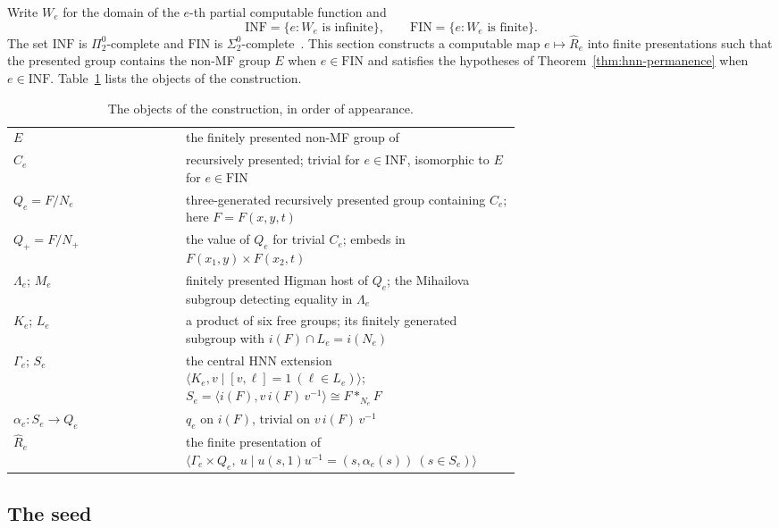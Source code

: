 \documentclass[11pt]{amsart}
\theoremstyle{remark}
\theoremstyle{plain}
\begin{document}
Write $W_e$ for the domain of the $e$-th partial computable function and
\[
 \mathrm{INF}=\{e:W_e\text{ is infinite}\},
 \qquad
 \mathrm{FIN}=\{e:W_e\text{ is finite}\}.
\]
The set $\mathrm{INF}$ is $\Pi^0_2$-complete and $\mathrm{FIN}$ is
$\Sigma^0_2$-complete~\cite[Chapter~IV]{Soare}.  This section constructs a
computable map $e\mapsto\widehat R_e$ into finite presentations such that
the presented group contains the non-MF group $E$ when $e\in\mathrm{FIN}$
and satisfies the hypotheses of Theorem~\ref{thm:hnn-permanence} when
$e\in\mathrm{INF}$.  Table~\ref{tab:objects} lists the objects of the
construction.

\begin{table}[htb]
\centering\small
\begin{tabular}{@{}l@{\qquad}p{0.66\linewidth}@{}}
$E$ & the finitely presented non-MF group of~\cite[Theorem~C]{NonMF} \\[1pt]
$C_e$ & recursively presented; trivial for $e\in\mathrm{INF}$, isomorphic
  to $E$ for $e\in\mathrm{FIN}$ \\[1pt]
$Q_e=F/N_e$ & three-generated recursively presented group containing
  $C_e$; here $F=F(x,y,t)$ \\[1pt]
$Q_+=F/N_+$ & the value of $Q_e$ for trivial $C_e$; embeds in
  $F(x_1,y)\times F(x_2,t)$ \\[1pt]
$\Lambda_e$; $M_e$ & finitely presented Higman host of $Q_e$; the
  Mihailova subgroup detecting equality in $\Lambda_e$ \\[1pt]
$K_e$; $L_e$ & a product of six free groups; its finitely generated
  subgroup with $i(F)\cap L_e=i(N_e)$ \\[1pt]
$\Gamma_e$; $S_e$ & the central HNN extension
  $\langle K_e,v\mid[v,\ell]=1\ (\ell\in L_e)\rangle$;
  $S_e=\langle i(F),v\,i(F)\,v^{-1}\rangle\cong F*_{N_e}F$ \\[1pt]
$\alpha_e\colon S_e\to Q_e$ & $q_e$ on $i(F)$, trivial on
  $v\,i(F)\,v^{-1}$ \\[1pt]
$\widehat R_e$ & the finite presentation of
  $\langle\Gamma_e\times Q_e,\ u\mid
   u(s,1)u^{-1}=(s,\alpha_e(s))\ (s\in S_e)\rangle$
\end{tabular}
\caption{The objects of the construction, in order of appearance.}
\label{tab:objects}
\end{table}

\subsection*{The seed}
\end{document}
